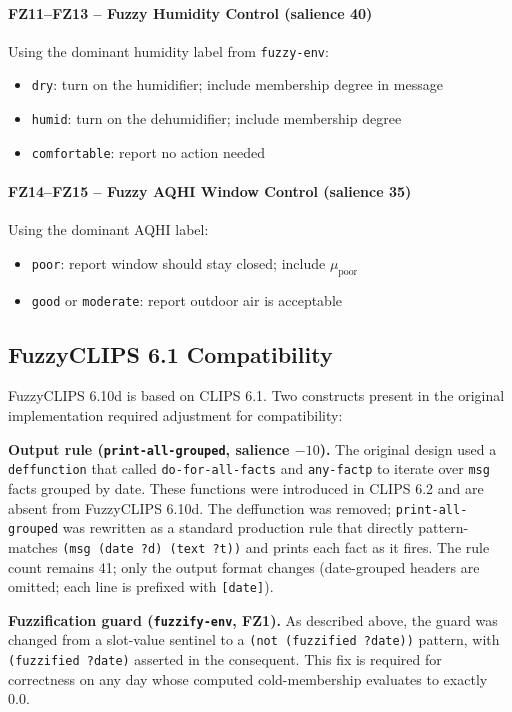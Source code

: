 \documentclass{article}
\begin{document}
\paragraph{FZ11–FZ13 -- Fuzzy Humidity Control (salience 40)}
Using the dominant humidity label from \texttt{fuzzy-env}:
\begin{itemize}
    \item \texttt{dry}: turn on the humidifier; include membership degree in message
    \item \texttt{humid}: turn on the dehumidifier; include membership degree
    \item \texttt{comfortable}: report no action needed
\end{itemize}

\paragraph{FZ14–FZ15 -- Fuzzy AQHI Window Control (salience 35)}
Using the dominant AQHI label:
\begin{itemize}
    \item \texttt{poor}: report window should stay closed; include $\mu_{\text{poor}}$
    \item \texttt{good} or \texttt{moderate}: report outdoor air is acceptable
\end{itemize}

\subsection{FuzzyCLIPS 6.1 Compatibility}

FuzzyCLIPS 6.10d is based on CLIPS 6.1. Two constructs present in the original implementation required adjustment for compatibility:

\textbf{Output rule (\texttt{print-all-grouped}, salience $-10$).}
The original design used a \texttt{deffunction} that called \texttt{do-for-all-facts} and \texttt{any-factp} to iterate over \texttt{msg} facts grouped by date.
These functions were introduced in CLIPS 6.2 and are absent from FuzzyCLIPS 6.10d.
The deffunction was removed; \texttt{print-all-grouped} was rewritten as a standard production rule that directly pattern-matches \texttt{(msg (date ?d) (text ?t))} and prints each fact as it fires.
The rule count remains 41; only the output format changes (date-grouped headers are omitted; each line is prefixed with \texttt{[date]}).

\textbf{Fuzzification guard (\texttt{fuzzify-env}, FZ1).}
As described above, the guard was changed from a slot-value sentinel to a \texttt{(not (fuzzified ?date))} pattern, with \texttt{(fuzzified ?date)} asserted in the consequent.
This fix is required for correctness on any day whose computed cold-membership evaluates to exactly 0.0.
\end{document}
